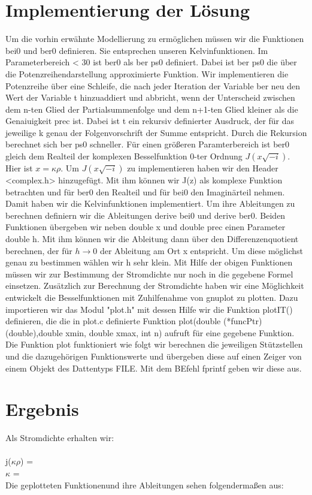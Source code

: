 \documentclass[ngerman]{scrartcl}
\begin{document}
\section*{Implementierung der Lösung}

Um die vorhin erwähnte Modellierung zu ermöglichen müssen wir die Funktionen bei0 und ber0 definieren. Sie entsprechen unseren Kelvinfunktionen. Im Parameterbereich < 30 ist ber0 als ber ps0 definiert. Dabei ist ber ps0 die über die Potenzreihendarstellung approximierte Funktion. Wir implementieren die Potenzreihe über eine Schleife, die nach jeder Iteration der Variable ber neu den Wert der Variable t hinzuaddiert und abbricht, wenn der Unterscheid zwischen dem n-ten Glied der Partialsummenfolge und dem n+1-ten Glied kleiner als die Genaiuigkeit prec ist. Dabei ist t ein rekursiv definierter Ausdruck, der für das jeweilige k genau der Folgenvorschrift der Summe entspricht. Durch die Rekursion berechnet sich ber ps0 schneller. Für einen größeren Paramterbereich ist ber0 gleich dem Realteil der komplexen Besselfunktion 0-ter Ordnung $J(x\sqrt{-i})$. Hier ist $ x = \kappa \rho $. Um $J(x\sqrt{-i})$ zu implementieren haben wir den Header <complex.h> hinzugefügt. Mit ihm können wir J(z) als komplexe Funktion betrachten und für ber0 den Realteil und für bei0 den Imaginärteil nehmen. Damit haben wir die Kelvinfunktionen implementiert. Um ihre Ableitungen zu berechnen definiern wir die Ableitungen derive bei0 und derive ber0. Beiden Funktionen übergeben wir neben double x und double prec einen Parameter double h. Mit ihm können wir die Ableitung dann über den Differenzenquotient berechnen, der für $h \to 0$ der Ableitung am Ort x entspricht. Um diese möglichst genau zu bestimmen wählen wir h sehr klein. Mit Hilfe der obigen Funktionen müssen wir zur Bestimmung der Stromdichte nur noch in die gegebene Formel einsetzen. Zusätzlich zur Berechnung der Stromdichte haben wir eine Möglichkeit entwickelt die Besselfunktionen mit Zuhilfenahme von gnuplot zu plotten. Dazu importieren wir das Modul "plot.h" mit dessen Hilfe wir die Funktion plotIT() definieren, die die in plot.c definierte Funktion plot(double (*funcPtr)(double),double xmin, double xmax, int n) aufruft für eine gegebene Funktion. Die Funktion plot funktioniert wie folgt wir berechnen die jeweiligen Stützstellen und die dazugehörigen Funktionswerte und übergeben diese auf einen Zeiger von einem Objekt des Dattentyps FILE. Mit dem BEfehl fprintf geben wir diese aus.

\section*{Ergebnis}

Als Stromdichte erhalten wir:\\ \\
j($\kappa \rho$) = \\
$\kappa$ = 
\\
Die geplotteten Funktionenund ihre Ableitungen sehen folgendermaßen aus:\\




 
\end{document}
